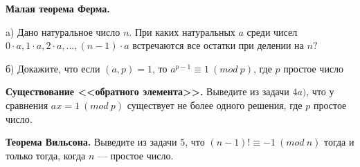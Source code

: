 \newpage

\hspace{3mm}

\textbf{Малая теорема Ферма.}

a) Дано натуральное число $n$. При каких натуральных $a$ среди чисел $0 \cdot a, 1 \cdot a, 2 \cdot a, \ldots,(n-1) \cdot a$ встречаются все остатки при делении на $n ?$

б) Докажите, что если $(a, p) = 1$, то $a^{p-1} \equiv 1 \ (mod \ p)$, где $p$ простое число

\textbf{Существование <<обратного элемента>>.} Выведите из задачи $4a)$, что у сравнения $ax = 1 \ (mod \ p)$ существует не более одного решения, где $p$ простое число.

\textbf{Теорема Вильсона.} Выведите из задачи $5$, что $(n-1)! \equiv -1 \ (mod \ n)$ тогда и только тогда, когда $n$ --- простое число.
